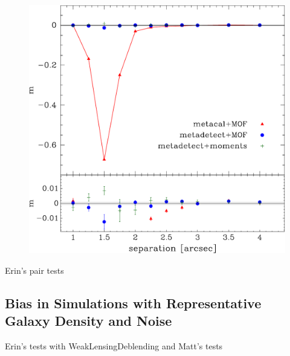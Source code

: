 \documentclass[fleqn,useAMS,usenatbib]{mnras}
\begin{document}
\begin{figure}
    \includegraphics[width=\columnwidth]{figures/pairs-mc-bdkpair.pdf}

\end{figure}
Erin's pair tests

\subsection{Bias in Simulations with Representative Galaxy Density and Noise}

Erin's tests with WeakLensingDeblending and Matt's tests
\end{document}
